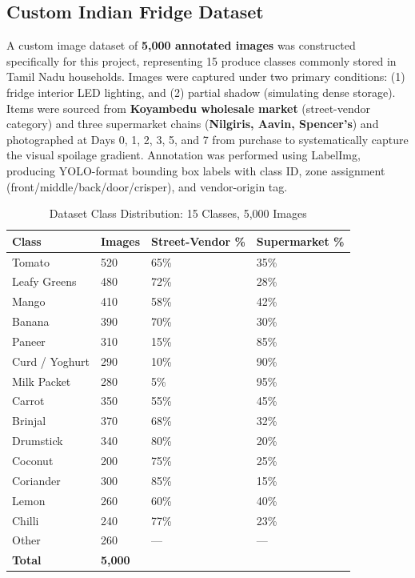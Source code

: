 \documentclass[12pt,a4paper]{report}
\begin{document}
\subsection{Custom Indian Fridge Dataset}
A custom image dataset of \textbf{5,000 annotated images} was constructed specifically for this project, representing 15 produce classes commonly stored in Tamil Nadu households. Images were captured under two primary conditions: (1) fridge interior LED lighting, and (2) partial shadow (simulating dense storage). Items were sourced from \textbf{Koyambedu wholesale market} (street-vendor category) and three supermarket chains (\textbf{Nilgiris, Aavin, Spencer's}) and photographed at Days 0, 1, 2, 3, 5, and 7 from purchase to systematically capture the visual spoilage gradient. Annotation was performed using LabelImg, producing YOLO-format bounding box labels with class ID, zone assignment (front/middle/back/door/crisper), and vendor-origin tag.

\begin{table}[ht]
\centering
\caption{Dataset Class Distribution: 15 Classes, 5,000 Images}
\label{tab:dataset}
\begin{tabularx}{\textwidth}{L{0.22\textwidth} C{0.15\textwidth} C{0.22\textwidth} C{0.22\textwidth}}
\toprule
\textbf{Class} & \textbf{Images} & \textbf{Street-Vendor \%} & \textbf{Supermarket \%} \\
\midrule
Tomato & 520 & 65\% & 35\% \\
Leafy Greens & 480 & 72\% & 28\% \\
Mango & 410 & 58\% & 42\% \\
Banana & 390 & 70\% & 30\% \\
Paneer & 310 & 15\% & 85\% \\
Curd / Yoghurt & 290 & 10\% & 90\% \\
Milk Packet & 280 & 5\% & 95\% \\
Carrot & 350 & 55\% & 45\% \\
Brinjal & 370 & 68\% & 32\% \\
Drumstick & 340 & 80\% & 20\% \\
Coconut & 200 & 75\% & 25\% \\
Coriander & 300 & 85\% & 15\% \\
Lemon & 260 & 60\% & 40\% \\
Chilli & 240 & 77\% & 23\% \\
Other & 260 & --- & --- \\
\midrule
\textbf{Total} & \textbf{5,000} & & \\
\bottomrule
\end{tabularx}
\end{table}
\end{document}
